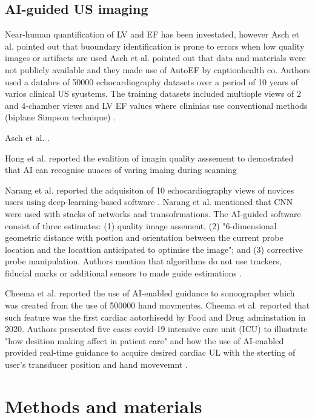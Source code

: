 \subsection{AI-guided US imaging}

Near-human quantification of LV and EF has been investated, however Asch et al. pointed out that buoundary identification is prone to errors when low quality images or artifacts are used
Asch et al. pointed out that data and materials were not publicly available and they made use of AutoEF by captionhealth co.
Authors used a databes of 50000 echocardiography datasets over a period of 10 years of varios clinical US syustems. 
The training datasets included multiople views of 2 and 4-chamber views and LV EF values where clininias use conventional methods (biplane Simpson technique) \cite{asch2019CIRIMAGING}.

Asch et al. \cite{asch2021CircImaging}.

Hong et al. reported the evalition of imagin quality asssement to demostrated that AI can recognise nuaces of varing imaing during scanning \cite{hong2021JACC}


Narang et al. reported the adquisiton of 10 echocardiography views of novices users using deep-learning-based software \cite{Narang2021JAMACARDIOLOGY}.
Narang et al. mentioned that CNN were used with stacks of networks and transofrmations. 
The AI-guided software consist of three estimates: (1) quality image assement, (2) "6-dimensional geometric distance with postion and orientation between the current probe location and the locattion anticipated to optimise the image"; and (3) corrective probe manipulation. \cite{Narang2021JAMACARDIOLOGY}
Authors mention that algorithms do not use trackers, fiducial marks or additional sensors to made guide estimations \cite{Narang2021JAMACARDIOLOGY}.


Cheema et al. reported the use of AI-enabled guidance to sonoographer which was created from the use of 500000 hand movmentes.
Cheema et al.  reported that such feature was the first cardiac aotorhisedd by Food and Drug adminstation in 2020. 
Authors presented five cases covid-19 intensive care unit (ICU) to illustrate "how desition making affect in patient care" and how the use of AI-enabled provided real-time guidance to acquire desired cardiac UL with the sterting of user's transducer position and hand movevemnt \cite{CHEEMA2021JACCCaseReports}.

\section{Methods and materials}
